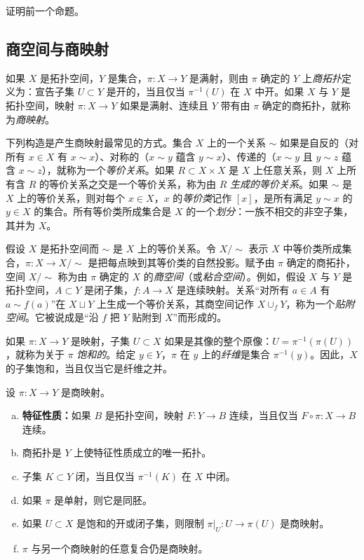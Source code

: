 \documentclass[../../main.tex]{subfiles}
\begin{document}
\begin{exercise}\label{exercise:appA-A-26}
证明前一个命题。
\end{exercise}

\subsection*{商空间与商映射}

如果 $X$ 是拓扑空间，$Y$ 是集合，$\pi:X\to Y$ 是满射，则由 $\pi$ 确定的 $Y$ 上\emph{商拓扑}定义为：宣告子集 $U\subset Y$ 是开的，当且仅当 $\pi^{-1}(U)$ 在 $X$ 中开。如果 $X$ 与 $Y$ 是拓扑空间，映射 $\pi:X\to Y$ 如果是满射、连续且 $Y$ 带有由 $\pi$ 确定的商拓扑，就称为\emph{商映射}。

下列构造是产生商映射最常见的方式。集合 $X$ 上的一个关系 $\sim$ 如果是自反的（对所有 $x\in X$ 有 $x\sim x$）、对称的（$x\sim y$ 蕴含 $y\sim x$）、传递的（$x\sim y$ 且 $y\sim z$ 蕴含 $x\sim z$），就称为一个\emph{等价关系}。如果 $R\subset X\times X$ 是 $X$ 上任意关系，则 $X$ 上所有含 $R$ 的等价关系之交是一个等价关系，称为由 $R$ \emph{生成的等价关系}。如果 $\sim$ 是 $X$ 上的等价关系，则对每个 $x\in X$，$x$ 的\emph{等价类}记作 $[x]$，是所有满足 $y\sim x$ 的 $y\in X$ 的集合。所有等价类所成集合是 $X$ 的一个\emph{划分}：一族不相交的非空子集，其并为 $X$。

假设 $X$ 是拓扑空间而 $\sim$ 是 $X$ 上的等价关系。令 $X/{\sim}$ 表示 $X$ 中等价类所成集合，$\pi:X\to X/{\sim}$ 是把每点映到其等价类的自然投影。赋予由 $\pi$ 确定的商拓扑，空间 $X/{\sim}$ 称为由 $\pi$ 确定的 $X$ 的\emph{商空间}（或\emph{粘合空间}）。例如，假设 $X$ 与 $Y$ 是拓扑空间，$A\subset Y$ 是闭子集，$f:A\to X$ 是连续映射。关系“对所有 $a\in A$ 有 $a\sim f(a)$”在 $X\sqcup Y$ 上生成一个等价关系，其商空间记作 $X\cup_f Y$，称为一个\emph{贴附空间}。它被说成是“沿 $f$ 把 $Y$ 贴附到 $X$”而形成的。

如果 $\pi:X\to Y$ 是映射，子集 $U\subset X$ 如果是其像的整个原像：$U=\pi^{-1}(\pi(U))$，就称为关于 $\pi$ \emph{饱和的}。给定 $y\in Y$，$\pi$ 在 $y$ 上的\emph{纤维}是集合 $\pi^{-1}(y)$。因此，$X$ 的子集饱和，当且仅当它是纤维之并。

\begin{theorem}[商映射的性质]\label{theorem:appA-quotient-properties}
设 $\pi:X\to Y$ 是商映射。
\begin{enumerate}[(a)]
\item \textbf{特征性质：}如果 $B$ 是拓扑空间，映射 $F:Y\to B$ 连续，当且仅当 $F\circ\pi:X\to B$ 连续。
\item 商拓扑是 $Y$ 上使特征性质成立的唯一拓扑。
\item 子集 $K\subset Y$ 闭，当且仅当 $\pi^{-1}(K)$ 在 $X$ 中闭。
\item 如果 $\pi$ 是单射，则它是同胚。
\item 如果 $U\subset X$ 是饱和的开或闭子集，则限制 $\pi|_U:U\to\pi(U)$ 是商映射。
\item $\pi$ 与另一个商映射的任意复合仍是商映射。
\end{enumerate}
\end{theorem}
\end{document}
